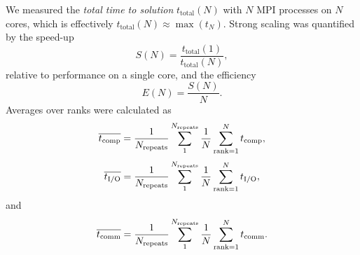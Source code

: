 We measured the \emph{total time to solution} $t_{\text{total}}(N)$ with $N$ MPI processes on $N$ cores, which is effectively
$t_{\text{total}}(N) \approx \max(t_{N})$. 
Strong scaling was quantified by the speed-up
\begin{equation}
  \label{eq:speedup}
  S(N) = \frac{t_{\text{total}}(1)}{t_{\text{total}}(N)},
\end{equation}
relative to performance on a single core, and the efficiency
\begin{equation}
  \label{eq:efficiency}
  E(N) = \frac{S(N)}{N}.
\end{equation}
Averages over ranks were calculated as
\begin{equation}
  \label{eq:avg-tcomp}
  \overline{{t}_{\text{comp}}} = \frac{1}{N_{\text{repeats}}}\sum_{1}^{N_{\text{repeats}}}\frac{1}{N}\sum_{\text{rank}=1}^{N}{t}_{\text{comp}} ,
\end{equation}
\begin{equation}
  \label{eq:avg-tIO}
  \overline{{t}_{\text{I/O}}} = \frac{1}{N_{\text{repeats}}}\sum_{1}^{N_{\text{repeats}}}\frac{1}{N}\sum_{\text{rank}=1}^{N}{t}_{\text{I/O}},
\end{equation}
and
\begin{equation}
  \label{eq:avg-tcomm}
  \overline{t_{\text{comm}}} = \frac{1}{N_{\text{repeats}}}\sum_{1}^{N_{\text{repeats}}}\frac{1}{N}\sum_{\text{rank}=1}^{N}t_{\text{comm}}.
\end{equation}

